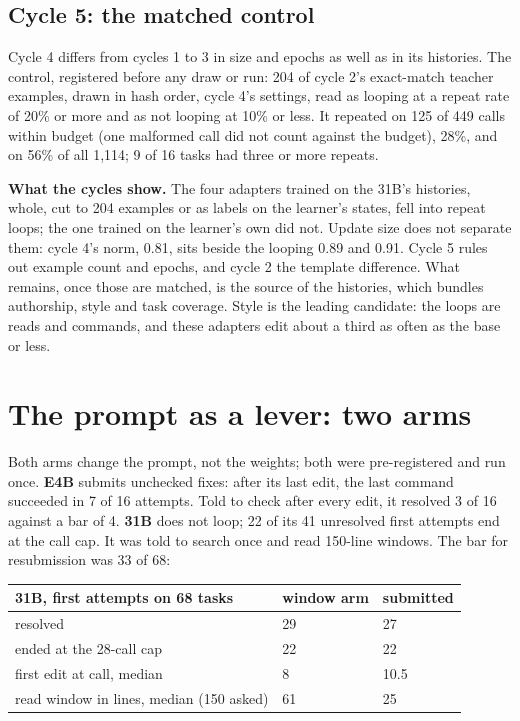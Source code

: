 \documentclass[
  11pt,
  a4paper,
]{article}
\begin{document}
\subsection{Cycle 5: the matched
control}\label{cycle-5-the-matched-control}

Cycle 4 differs from cycles 1 to 3 in size and epochs as well as in its
histories. The control, registered before any draw or run: 204 of cycle
2's exact-match teacher examples, drawn in hash order, cycle 4's
settings, read as looping at a repeat rate of 20\% or more and as not
looping at 10\% or less. It repeated on 125 of 449 calls within budget
(one malformed call did not count against the budget), 28\%, and on 56\%
of all 1,114; 9 of 16 tasks had three or more repeats.

\textbf{What the cycles show.} The four adapters trained on the 31B's
histories, whole, cut to 204 examples or as labels on the learner's
states, fell into repeat loops; the one trained on the learner's own did
not. Update size does not separate them: cycle 4's norm, 0.81, sits
beside the looping 0.89 and 0.91. Cycle 5 rules out example count and
epochs, and cycle 2 the template difference. What remains, once those
are matched, is the source of the histories, which bundles authorship,
style and task coverage. Style is the leading candidate: the loops are
reads and commands, and these adapters edit about a third as often as
the base or less.

\section{The prompt as a lever: two
arms}\label{the-prompt-as-a-lever-two-arms}

Both arms change the prompt, not the weights; both were pre-registered
and run once. \textbf{E4B} submits unchecked fixes: after its last edit,
the last command succeeded in 7 of 16 attempts. Told to check after
every edit, it resolved 3 of 16 against a bar of 4. \textbf{31B} does
not loop; 22 of its 41 unresolved first attempts end at the call cap. It
was told to search once and read 150-line windows. The bar for
resubmission was 33 of 68:

\begin{longtable}[]{@{}lll@{}}
\toprule\noalign{}
31B, first attempts on 68 tasks & window arm & submitted \\
\midrule\noalign{}
\endhead
\bottomrule\noalign{}
\endlastfoot
resolved & 29 & 27 \\
ended at the 28-call cap & 22 & 22 \\
first edit at call, median & 8 & 10.5 \\
read window in lines, median (150 asked) & 61 & 25 \\
\end{longtable}
\end{document}
